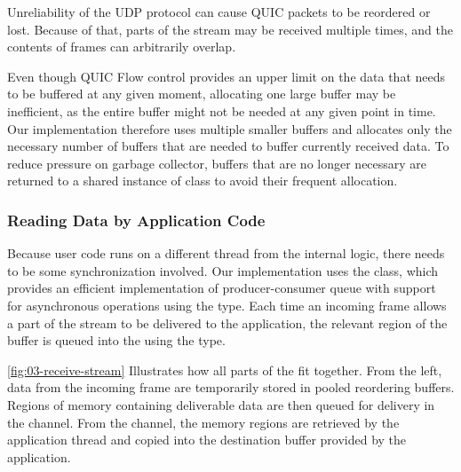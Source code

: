 Unreliability of the UDP protocol can cause QUIC packets to be reordered or lost. Because of that,
parts of the stream may be received multiple times, and the contents of \STREAM{} frames can
arbitrarily overlap.

Even though QUIC Flow control provides an upper limit on the data that needs to be buffered at any
given moment, allocating one large buffer may be inefficient, as the entire buffer might not be
needed at any given point in time. Our implementation therefore uses multiple smaller buffers and
allocates only the necessary number of buffers that are needed to buffer currently received data. To
reduce pressure on garbage collector, buffers that are no longer necessary are returned to a shared
instance of  class to avoid their frequent allocation.

\subsubsection{Reading Data by Application Code}

Because user code runs on a different thread from the internal \QuicConnection{} logic, there needs
to be some synchronization involved. Our implementation uses the  class, which
provides an efficient implementation of producer-consumer queue with support for asynchronous
operations using the  type. Each time an incoming \STREAM{} frame allows a part
of the stream to be delivered to the application, the relevant region of the buffer is queued into
the  using the  type.






\autoref{fig:03-receive-stream} Illustrates how all parts of the \ReceiveStream{} fit together.
From the left, data from the incoming \STREAM{} frame are temporarily stored in pooled reordering
buffers. Regions of memory containing deliverable data are then queued for delivery in the channel.
From the channel, the memory regions are retrieved by the application thread and copied into the
destination buffer provided by the application.

